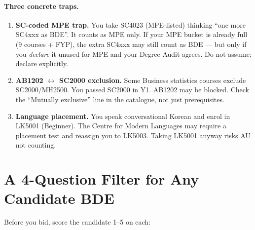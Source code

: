 \paragraph{Three concrete traps.}
\begin{enumerate}
    \item \textbf{SC-coded MPE trap.} You take SC4023 (MPE-listed) thinking ``one more SC4xxx as BDE''. It counts as MPE only. If your MPE bucket is already full (9 courses + FYP), the extra SC4xxx may still count as BDE --- but only if you \emph{declare} it unused for MPE and your Degree Audit agrees. Do not assume; declare explicitly.
    \item \textbf{AB1202 $\leftrightarrow$ SC2000 exclusion.} Some Business statistics courses exclude SC2000/MH2500. You passed SC2000 in Y1. AB1202 may be blocked. Check the ``Mutually exclusive'' line in the catalogue, not just prerequisites.
    \item \textbf{Language placement.} You speak conversational Korean and enrol in LK5001 (Beginner). The Centre for Modern Languages may require a placement test and reassign you to LK5003. Taking LK5001 anyway risks AU not counting.
\end{enumerate}

\section{A 4-Question Filter for Any Candidate BDE}
\label{sec:bde-filter}

Before you bid, score the candidate 1--5 on each:

\begin{center}
\end{center}

